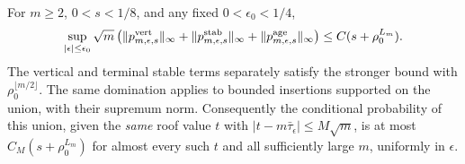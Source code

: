 \begin{theorem}
\label{thm:v60-perturbed-height}
For $m\ge2$, $0<s<1/8$, and any fixed $0<\epsilon_0<1/4$,
\begin{equation}\label{eq:v60-perturbed-height}
 \sup_{|\epsilon|\le\epsilon_0}\sqrt m
 \left(\|p_{m,\epsilon,s}^{\rm vert}\|_\infty
       +\|p_{m,\epsilon,s}^{\rm stab}\|_\infty
       +\|p_{m,\epsilon,s}^{\rm age}\|_\infty\right)
                      \le C(s+\rho_0^{L_m}).
\end{equation}
The vertical and terminal stable terms separately satisfy the stronger
bound with $\rho_0^{\lfloor m/2\rfloor}$. The same domination applies
to bounded insertions supported on the union, with their supremum norm.
Consequently the conditional probability of this union, given the
\emph{same} roof value $t$ with
$|t-m\bar\tau_\epsilon|\le M\sqrt m$, is at most
$C_M(s+\rho_0^{L_m})$ for almost every such $t$ and all sufficiently
large $m$, uniformly in $\epsilon$.
\end{theorem}
